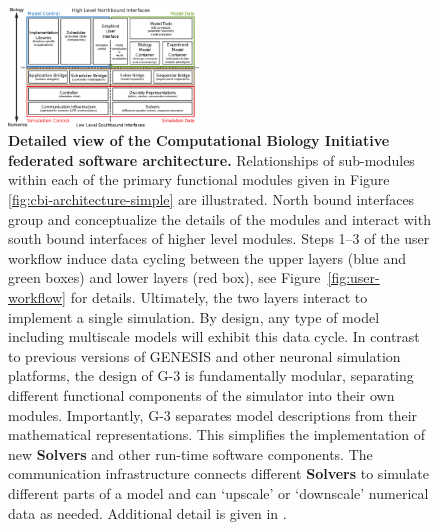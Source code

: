 \documentclass[11pt,3p,twocolumn]{JMN}
\begin{document}
\begin{figure}[h!t]
  \begin{center}
    \includegraphics[width=0.45\textwidth]{figures/cbi-architecture-expanded.eps}
  \end{center}
  \caption{ \small{{\bf Detailed view of the Computational Biology Initiative
      federated software architecture.} Relationships of sub-modules
    within each of the primary functional modules given in Figure
    \ref{fig:cbi-architecture-simple} are illustrated.  North bound interfaces group
    and conceptualize the details of the modules and interact with
    south bound interfaces of higher level modules.  Steps 1--3 of the
    user workflow induce data cycling between the
    upper layers (blue and green boxes) and lower layers (red box), see Figure~\ref{fig:user-workflow} for details.
    Ultimately, the two layers interact to implement a single simulation.
    By design, any type of model including multiscale models will
    exhibit this data cycle. In contrast to previous versions of GENESIS and
    other neuronal simulation platforms, the design of G-3 is
    fundamentally modular, separating different functional components
    of the simulator into their own modules. Importantly, G-3
    separates model descriptions from their mathematical representations.  This simplifies the
    implementation of new {\bf Solvers} and other run-time software
    components. The communication infrastructure connects different
    {\bf Solvers} to simulate different parts of a model and can `upscale' or `downscale'
    numerical data as needed. Additional detail is given in \cite{cornelis12}.}}
  \label{fig:cbi-architecture-expanded}
\end{figure}

\end{document}
